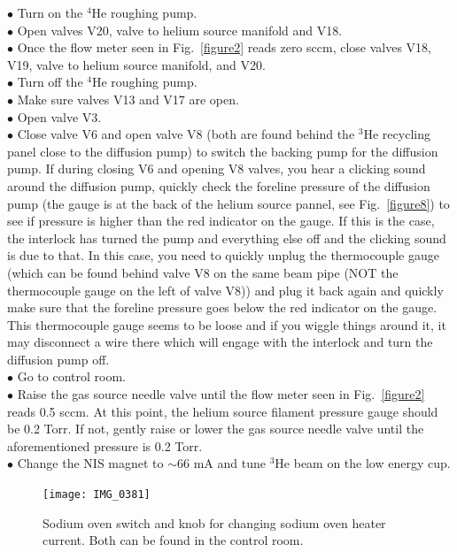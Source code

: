 \documentclass{article}
\begin{document}
$\bullet$ Turn on the $^{4}$He roughing pump.\\
$\bullet$ Open valves V20, valve to helium source manifold and V18.\\
$\bullet$ Once the flow meter seen in Fig.~\ref{figure2} reads zero sccm, close valves V18, V19, valve to helium source manifold, and V20.\\
$\bullet$ Turn off the $^{4}$He roughing pump.\\
$\bullet$ Make sure valves V13 and V17 are open.\\
$\bullet$ Open valve V3.\\
$\bullet$ Close valve V6 and open valve V8 (both are found behind the $^{3}$He recycling panel close to the diffusion pump) to switch the backing pump for the diffusion pump. If during closing V6 and opening V8 valves, you hear a clicking sound around the diffusion pump, quickly check the foreline pressure of the diffusion pump (the gauge is at the back of the helium source pannel, see Fig.~\ref{figure8}) to see if pressure is higher than the red indicator on the gauge. If this is the case, the interlock has turned the pump and everything else off and the clicking sound is due to that. In this case, you need to quickly unplug the thermocouple gauge (which can be found behind valve V8 on the same beam pipe (NOT the thermocouple gauge on the left of valve V8)) and plug it back again and quickly make sure that the foreline pressure goes below the red indicator on the gauge. This thermocouple gauge seems to be loose and if you wiggle things around it, it may disconnect a wire there which will engage with the interlock and turn the diffusion pump off.\\
$\bullet$ Go to control room.\\
$\bullet$ Raise the gas source needle valve until the flow meter seen in Fig.~\ref{figure2} reads 0.5 sccm. At this point, the helium source filament pressure gauge should be 0.2 Torr. If not, gently raise or lower the gas source needle valve until the aforementioned pressure is 0.2 Torr.\\
$\bullet$ Change the NIS magnet to $\sim$66 mA and tune $^{3}$He beam on the low energy cup.

\begin{figure}
\begin{center}
\texttt{[image: IMG\_0381]}\\
\end{center}
\caption{\label{figure18}Sodium oven switch and knob for changing sodium oven heater current. Both can be found in the control room.}
\end{figure}
\end{document}
